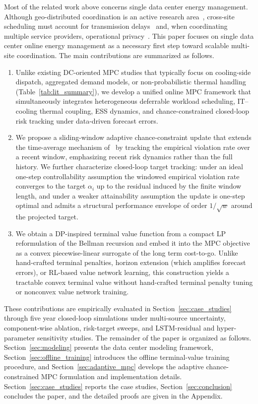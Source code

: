 \documentclass[a4paper,fleqn]{cas-dc}
\theoremstyle{plain}
\theoremstyle{remark}
\theoremstyle{plain}
\begin{document}
Most of the related work above concerns single data center energy management. Although geo-distributed coordination is an active research area~\cite{souza2024_casper_carbon_aware,maji2023_carbon_multicloud}, cross-site scheduling must account for transmission delays~\cite{li2021_joint_energy_compute} and, when coordinating multiple service providers, operational privacy~\cite{sun2025_privacy_energy_sharing}. This paper focuses on single data center online energy management as a necessary first step toward scalable multi-site coordination. The main contributions are summarized as follows.
\begin{enumerate}
\item Unlike existing DC-oriented MPC studies that typically focus on cooling-side dispatch, aggregated demand models, or non-probabilistic thermal handling (Table~\ref{tab:lit_summary}), we develop a unified online MPC framework that simultaneously integrates heterogeneous deferrable workload scheduling, IT--cooling thermal coupling, ESS dynamics, and chance-constrained closed-loop risk tracking under data-driven forecast errors.

\item We propose a sliding-window adaptive chance-constraint update that extends the time-average mechanism of~\cite{ghosh2025_adaptive_relaxation_ccsmpc} by tracking the empirical violation rate over a recent window, emphasizing recent risk dynamics rather than the full history. We further characterize closed-loop target tracking: under an ideal one-step controllability assumption the windowed empirical violation rate converges to the target $\alpha_i$ up to the residual induced by the finite window length, and under a weaker attainability assumption the update is one-step optimal and admits a structural performance envelope of order $1/\sqrt{w}$ around the projected target.

\item We obtain a DP-inspired terminal value function from a compact LP reformulation of the Bellman recursion and embed it into the MPC objective as a convex piecewise-linear surrogate of the long term cost-to-go. Unlike hand-crafted terminal penalties, horizon extension (which amplifies forecast errors), or RL-based value network learning, this construction yields a tractable convex terminal value without hand-crafted terminal penalty tuning or nonconvex value network training.
\end{enumerate}

These contributions are empirically evaluated in Section~\ref{sec:case_studies} through five year closed-loop simulations under multi-source uncertainty, component-wise ablation, risk-target sweeps, and LSTM-residual and hyper-parameter sensitivity studies. The remainder of the paper is organized as follows. Section~\ref{sec:modeling} presents the data center modeling framework, Section~\ref{sec:offline_training} introduces the offline terminal-value training procedure, and Section~\ref{sec:adaptive_mpc} develops the adaptive chance-constrained MPC formulation and implementation details. Section~\ref{sec:case_studies} reports the case studies, Section~\ref{sec:conclusion} concludes the paper, and the detailed proofs are given in the Appendix.
\end{document}
